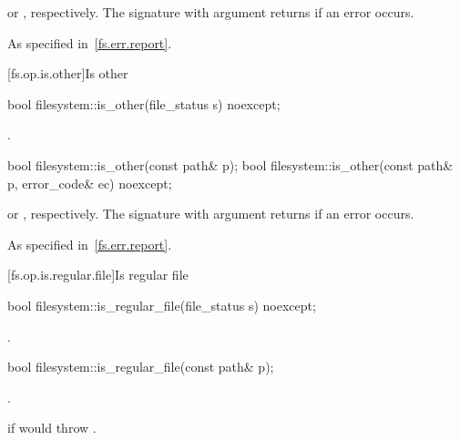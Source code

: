 \begin{itemdescr}
\pnum
\returns
{} or , respectively.
The signature with argument  returns  if an error occurs.

\pnum
\throws
As specified in~\ref{fs.err.report}.
\end{itemdescr}


[fs.op.is.other]{Is other}

%
\begin{itemdecl}
bool filesystem::is_other(file_status s) noexcept;
\end{itemdecl}

\begin{itemdescr}
\pnum
\returns
{}.
\end{itemdescr}

%
\begin{itemdecl}
bool filesystem::is_other(const path& p);
bool filesystem::is_other(const path& p, error_code& ec) noexcept;
\end{itemdecl}

\begin{itemdescr}
\pnum
\returns
{} or ,
  respectively. The signature with argument  returns 
  if an error occurs.

\pnum
\throws
As specified in~\ref{fs.err.report}.
\end{itemdescr}


[fs.op.is.regular.file]{Is regular file}

%
\begin{itemdecl}
bool filesystem::is_regular_file(file_status s) noexcept;
\end{itemdecl}

\begin{itemdescr}
\pnum
\returns
{}.
\end{itemdescr}

%
\begin{itemdecl}
bool filesystem::is_regular_file(const path& p);
\end{itemdecl}

\begin{itemdescr}
\pnum
\returns
{}.

\pnum
\throws
{} if  would throw .
\end{itemdescr}

